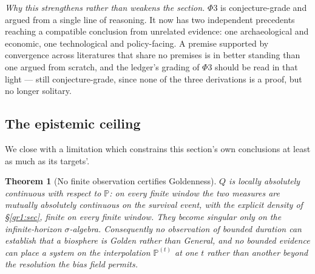 \documentclass[11pt]{article}
\numberwithin{equation}{section}
\theoremstyle{plain}
\newtheorem{theorem}{Theorem}[section]
\theoremstyle{definition}
\theoremstyle{remark}
\newcommand{\PP}{\mathbb{P}}
\begin{document}
\emph{Why this strengthens rather than weakens the section.} $\Phi3$ is
conjecture-grade and argued from a single line of reasoning. It now has
two independent precedents reaching a compatible conclusion from
unrelated evidence: one archaeological and economic, one
technological and policy-facing. A premise supported by convergence
across literatures that share no premises is in better standing than one
argued from scratch, and the ledger's grading of $\Phi3$ should be read
in that light --- still conjecture-grade, since none of the three
derivations is a proof, but no longer solitary.

\subsection{The epistemic ceiling}\label{gr:sub:ceiling}

We close with a limitation which constrains this section's own
conclusions at least as much as its targets'.

\begin{theorem}[No finite observation certifies Goldenness]
\label{gr:thm:ceiling}
$Q$ is locally absolutely continuous with respect to $\PP$: on every
finite window the two measures are mutually absolutely continuous on the
survival event, with the explicit density of \S\ref{gr1:sec}, finite on
every finite window. They
become singular only on the infinite-horizon $\sigma$-algebra.
Consequently no observation of bounded duration can establish that a
biosphere is Golden rather than General, and no bounded evidence can
place a system on the interpolation $\PP^{(t)}$ at one $t$ rather than
another beyond the resolution the bias field permits.
\end{theorem}
\end{document}
